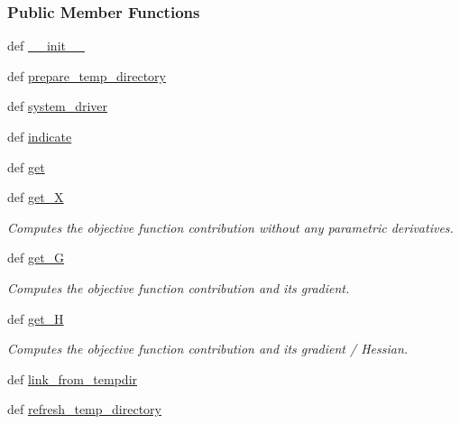 \subsubsection*{Public Member Functions}
\begin{DoxyCompactItemize}
\item 
def \hyperlink{classforcebalance_1_1tinkerio_1_1BindingEnergy__TINKER_aa7a420d09d5b0370fa8c8bdd713e1adf}{\-\_\-\-\_\-init\-\_\-\-\_\-}
\item 
def \hyperlink{classforcebalance_1_1tinkerio_1_1BindingEnergy__TINKER_a88b6b57fdddb3c8f79e8d0ae48b71e88}{prepare\-\_\-temp\-\_\-directory}
\item 
def \hyperlink{classforcebalance_1_1tinkerio_1_1BindingEnergy__TINKER_a615e696facc0170924921bc8cdd4525e}{system\-\_\-driver}
\item 
def \hyperlink{classforcebalance_1_1binding_1_1BindingEnergy_a12deb881863b64276bf847a949a36845}{indicate}
\item 
def \hyperlink{classforcebalance_1_1binding_1_1BindingEnergy_a263fadef13141ef341a01d1f538f85af}{get}
\item 
def \hyperlink{classforcebalance_1_1target_1_1Target_a606dd136f195c267c05a2455405e5949}{get\-\_\-\-X}
\begin{DoxyCompactList}\small\item\em Computes the objective function contribution without any parametric derivatives. \end{DoxyCompactList}\item 
def \hyperlink{classforcebalance_1_1target_1_1Target_afa8cc38c8bba8861c072e789717aa049}{get\-\_\-\-G}
\begin{DoxyCompactList}\small\item\em Computes the objective function contribution and its gradient. \end{DoxyCompactList}\item 
def \hyperlink{classforcebalance_1_1target_1_1Target_a1d2ee27fe86a09769c1816af23b09adb}{get\-\_\-\-H}
\begin{DoxyCompactList}\small\item\em Computes the objective function contribution and its gradient / Hessian. \end{DoxyCompactList}\item 
def \hyperlink{classforcebalance_1_1target_1_1Target_a5aa4958cea0a48138511567a076c5a82}{link\-\_\-from\-\_\-tempdir}
\item 
def \hyperlink{classforcebalance_1_1target_1_1Target_afe815eafab06ac92f10bbf4b88ad95c8}{refresh\-\_\-temp\-\_\-directory}

\end{DoxyCompactItemize}
